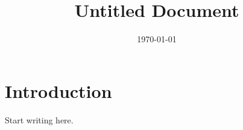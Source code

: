 \documentclass{article}
\title{Untitled Document}
\author{}
\date{\today}
\begin{document}
\maketitle

\section{Introduction}

Start writing here.
\end{document}
